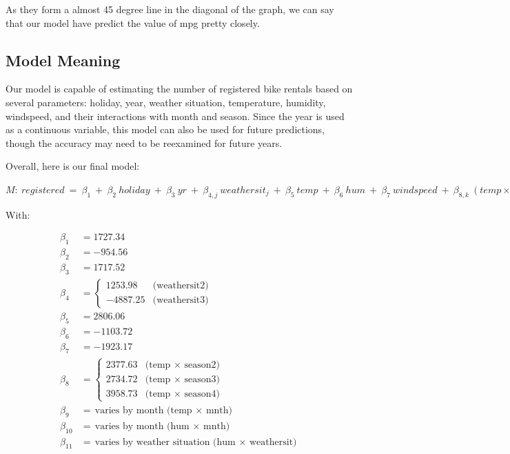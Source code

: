 As they form a almost 45 degree line in the diagonal of the graph, we can say that our model have predict the value of mpg pretty closely.

\subsection{Model Meaning}

Our model is capable of estimating the number of registered bike rentals based on several parameters: holiday, year, weather situation, temperature, humidity, windspeed, and their interactions with month and season. Since the year is used as a continuous variable, this model can also be used for future predictions, though the accuracy may need to be reexamined for future years.

Overall, here is our final model:

\begin{center}
$
M: \ registered \ = \ \beta_1 \ + \ \beta_2 \ holiday \ + \ \beta_3 \ yr \ + \ \beta_{4, j} \ weathersit_j \ + \ \beta_5 \ temp \ + \ \beta_6 \ hum \ + \ \beta_7 \ windspeed \ + \ \beta_{8, k} \ (temp \times season_k) \ + \ \beta_{9, i} \ (temp \times mnth_i) \ + \ \beta_{10, i} \ (hum \times mnth_i) \ + \ \beta_{11, j} \ (hum \times weathersit_j) \ + \ \epsilon
$
\end{center}

With:

\begin{center}
    \begin{align*}
    \beta_1 & = 1727.34 \\
    \beta_2 & = -954.56 \\
    \beta_3 & = 1717.52 \\
    \beta_4 & = 
        \begin{cases} 
          1253.98 & \text{(weathersit2)} \\
          -4887.25 & \text{(weathersit3)} 
        \end{cases} \\
    \beta_5 & = 2806.06 \\
    \beta_6 & = -1103.72 \\
    \beta_7 & = -1923.17 \\
    \beta_8 & = 
        \begin{cases} 
          2377.63 & \text{(temp $\times$ season2)} \\
          2734.72 & \text{(temp $\times$ season3)} \\
          3958.73 & \text{(temp $\times$ season4)} 
        \end{cases} \\
    \beta_9 & = \text{varies by month (temp $\times$ mnth)} \\
    \beta_{10} & = \text{varies by month (hum $\times$ mnth)} \\
    \beta_{11} & = \text{varies by weather situation (hum $\times$ weathersit)} \\
    \end{align*}
\end{center}

